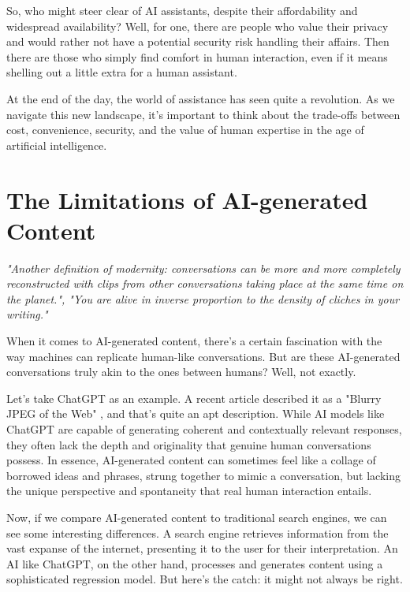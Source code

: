 So, who might steer clear of AI assistants, despite their affordability and widespread availability? Well, for one, there are people who value their privacy and would rather not have a potential security risk handling their affairs. Then there are those who simply find comfort in human interaction, even if it means shelling out a little extra for a human assistant.

At the end of the day, the world of assistance has seen quite a revolution. As we navigate this new landscape, it's important to think about the trade-offs between cost, convenience, security, and the value of human expertise in the age of artificial intelligence.

\section{The Limitations of AI-generated Content}

\textit{"Another definition of modernity: conversations can be more and more completely reconstructed with clips from other conversations taking place at the same time on the planet.", "You are alive in inverse proportion to the density of cliches in your writing."}

When it comes to AI-generated content, there's a certain fascination with the way machines can replicate human-like conversations. But are these AI-generated conversations truly akin to the ones between humans? Well, not exactly.

Let's take ChatGPT as an example. A recent article described it as a "Blurry JPEG of the Web" , and that's quite an apt description. While AI models like ChatGPT are capable of generating coherent and contextually relevant responses, they often lack the depth and originality that genuine human conversations possess. In essence, AI-generated content can sometimes feel like a collage of borrowed ideas and phrases, strung together to mimic a conversation, but lacking the unique perspective and spontaneity that real human interaction entails.

Now, if we compare AI-generated content to traditional search engines, we can see some interesting differences. A search engine retrieves information from the vast expanse of the internet, presenting it to the user for their interpretation. An AI like ChatGPT, on the other hand, processes and generates content using a sophisticated regression model. But here's the catch: it might not always be right.

